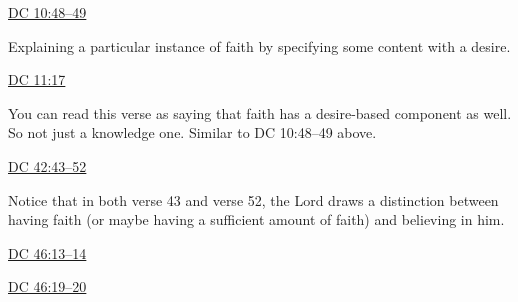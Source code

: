 		\begin{compactdesc}
			\item[{\hyperref[DC10-48]{DC 10:48--49}}] \phantom{.}
				\begin{compactitem}
					\item Explaining a particular instance of faith by specifying some content with a desire.
				\end{compactitem}
			\item[{\hyperref[DC11-17]{DC 11:17}}] \phantom{.}
				\begin{compactitem}
					\item You can read this verse as saying that faith has a desire-based component as well. So not just a knowledge one. Similar to DC 10:48--49 above.
				\end{compactitem}
			\item[{\hyperref[DC42-43]{DC 42:43--52}}] \phantom{.}
				\begin{compactitem}
					\item Notice that in both verse 43 and verse 52, the Lord draws a distinction between having faith (or maybe having a sufficient amount of faith) and believing in him.
				\end{compactitem}
			\item[{\hyperref[DC46-13]{DC 46:13--14}}]
			\item[{\hyperref[DC46-19]{DC 46:19--20}}]
		\end{compactdesc}
		
	
		
		

	
